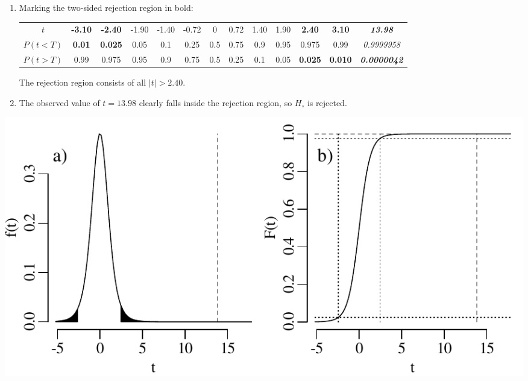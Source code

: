 \begin{enumerate}
\item Marking the two-sided rejection region in bold:
  
  \begin{center}
    \begin{tabular}{c|c@{\gap}c@{\gap}c@{\gap}c@{\gap}
        c@{\gap}c@{\gap}c@{\gap}c@{\gap}c@{\gap}c@{\gap}c@{\gap}c}
      $t$ & \textbf{-3.10} & \textbf{-2.40} & -1.90 & -1.40 & -0.72 &
      0 & 0.72 & 1.40 & 1.90 & \textbf{2.40} &
      \textbf{3.10} & \textbf{\emph{13.98}}\\
      $P(t<T)$ & \textbf{0.01} & \textbf{0.025} & 0.05 & 0.1 & 0.25 &
      0.5 & 0.75 & 0.9 & 0.95 & 0.975 & 0.99 & \emph{0.9999958}\\
      $P(t>T)$ & 0.99 & 0.975 & 0.95 & 0.9 & 0.75 & 0.5 &
      0.25 & 0.1 & 0.05 & \textbf{0.025} & \textbf{0.010} &
      \textbf{\emph{0.0000042}}
    \end{tabular}
  \end{center}

  The rejection region consists of all $|t|>{2.40}$.

\item The observed value of $t=13.98$ clearly falls inside the
  rejection region, so $H_\circ$ is rejected.
  
\end{enumerate}

\noindent\begin{minipage}[t][][b]{.6\textwidth}
  \includegraphics[width=\textwidth]{../figures/tr.pdf}\\
\end{minipage}
\begin{minipage}[t][][t]{.4\textwidth}
  \label{fig:tr}
\end{minipage}

